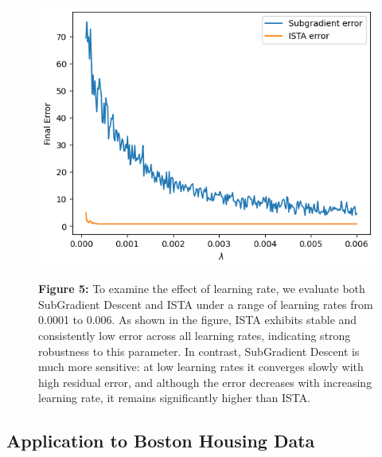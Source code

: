 \documentclass[11pt]{article}
\begin{document}
\begin{figure}[H]
    \centering
    \begin{minipage}{0.3\textwidth}
        \includegraphics[width=\linewidth]{figures/fig7.png}
    \end{minipage}
    \hfill
    \begin{minipage}{0.5\textwidth}
        \small
        \textbf{Figure 5:}
        To examine the effect of learning rate, we evaluate both SubGradient Descent and ISTA under a range of learning rates from 0.0001 to 0.006.
        As shown in the figure, ISTA exhibits stable and consistently low error across all learning rates, indicating strong robustness to this parameter. In contrast, SubGradient Descent is much more sensitive: at low learning rates it converges slowly with high residual error, and although the error decreases with increasing learning rate, it remains significantly higher than ISTA.
    \end{minipage}
\end{figure}

\subsection{Application to Boston Housing Data}
\end{document}
